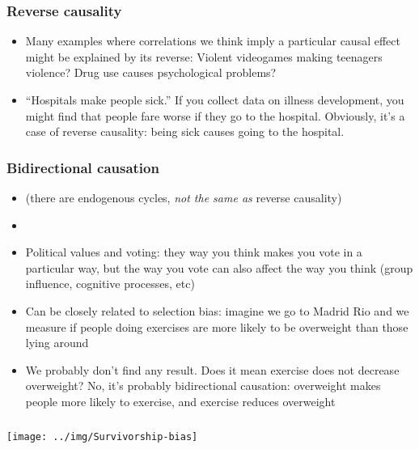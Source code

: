\documentclass[aspectratio=43]{beamer}
\begin{document}
\begin{frame}
\frametitle{Reverse causality}\label{reverse}
\centering

\begin{itemize}
  \item Many examples where correlations we think imply a particular causal effect might be explained by its reverse: Violent videogames making teenagers violence? Drug use causes psychological problems?
  \item ``Hospitals make people sick.'' If you collect data on illness development, you might find that people fare worse if they go to the hospital. Obviously, it's a case of reverse causality: being sick causes going to the hospital.
\end{itemize}

\end{frame}

\begin{frame}
\frametitle{Bidirectional causation}\label{bidirect}
\centering


\begin{itemize}
  \item (there are endogenous cycles, \textit{not the same as} reverse causality)
  \item[]
  \item Political values and voting: they way you think makes you vote in a particular way, but the way you vote can also affect the way you think (group influence, cognitive processes, etc)
  \item Can be closely related to selection bias: imagine we go to Madrid Rio and we measure if people doing exercises are more likely to be overweight than those lying around
  \item We probably don't find any result. Does it mean exercise does not decrease overweight? No, it's probably bidirectional causation: overweight makes people more likely to exercise, and exercise reduces overweight
\end{itemize}

\end{frame}

\begin{frame}
\frametitle{}
\centering

\texttt{[image: ../img/Survivorship-bias]}

\end{frame}
\end{document}
